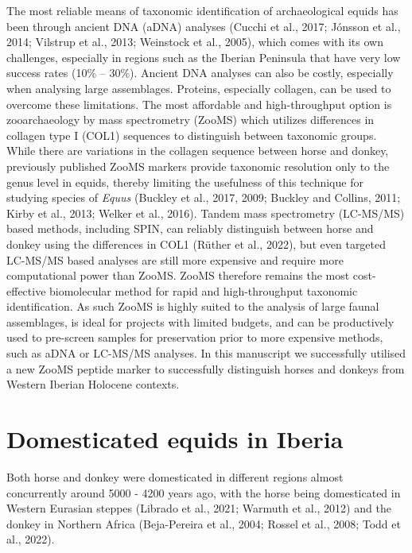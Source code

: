 \documentclass[preprint, 3p, authoryear]{elsarticle} %
\begin{document}
The most reliable means of taxonomic identification of archaeological equids has been through ancient DNA (aDNA) analyses (Cucchi et al., 2017; Jónsson et al., 2014; Vilstrup et al., 2013; Weinstock et al., 2005), which comes with its own challenges, especially in regions such as the Iberian Peninsula that have very low success rates (10\% -- 30\%). Ancient DNA analyses can also be costly, especially when analysing large assemblages. Proteins, especially collagen, can be used to overcome these limitations. The most affordable and high-throughput option is zooarchaeology by mass spectrometry (ZooMS) which utilizes differences in collagen type I (COL1) sequences to distinguish between taxonomic groups. While there are variations in the collagen sequence between horse and donkey, previously published ZooMS markers provide taxonomic resolution only to the genus level in equids, thereby limiting the usefulness of this technique for studying species of \emph{Equus} (Buckley et al., 2017, 2009; Buckley and Collins, 2011; Kirby et al., 2013; Welker et al., 2016). Tandem mass spectrometry (LC-MS/MS) based methods, including SPIN, can reliably distinguish between horse and donkey using the differences in COL1 (Rüther et al., 2022), but even targeted LC-MS/MS based analyses are still more expensive and require more computational power than ZooMS. ZooMS therefore remains the most cost-effective biomolecular method for rapid and high-throughput taxonomic identification. As such ZooMS is highly suited to the analysis of large faunal assemblages, is ideal for projects with limited budgets, and can be productively used to pre-screen samples for preservation prior to more expensive methods, such as aDNA or LC-MS/MS analyses. In this manuscript we successfully utilised a new ZooMS peptide marker to successfully distinguish horses and donkeys from Western Iberian Holocene contexts.

\hypertarget{domesticated-equids-in-iberia}{%
\section{Domesticated equids in Iberia}\label{domesticated-equids-in-iberia}}

Both horse and donkey were domesticated in different regions almost concurrently around 5000 - 4200 years ago, with the horse being domesticated in Western Eurasian steppes (Librado et al., 2021; Warmuth et al., 2012) and the donkey in Northern Africa (Beja-Pereira et al., 2004; Rossel et al., 2008; Todd et al., 2022).
\end{document}
